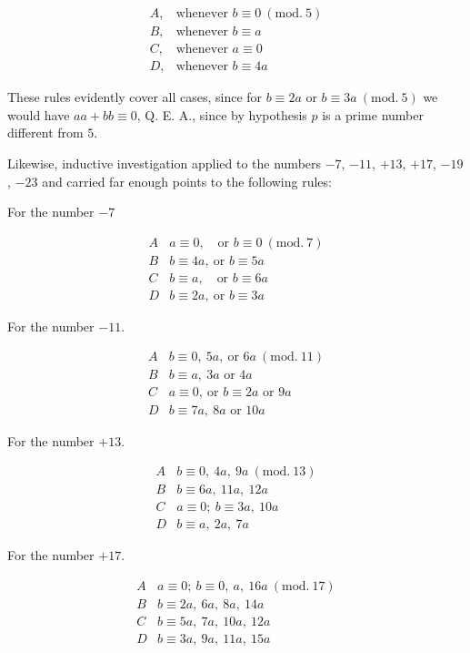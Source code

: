 %
\[
\begin{array}{ll}
A,&\text{whenever }b\equiv0\ (\mathrm{mod.}\ 5)\\
B,&\text{whenever }b\equiv a\\
C,&\text{whenever }a\equiv0\\
D,&\text{whenever }b\equiv4a
\end{array}
\]

These rules evidently cover all cases, since for $b\equiv2a$ or $b\equiv3a\ (\mathrm{mod.}\ 5)$ we would have $aa+bb\equiv0$, Q. E. A., since by hypothesis $p$ is a prime number different from $5$.

Likewise, inductive investigation applied to the numbers $-7$, $-11$, $+13$, $+17$, $-19$, $-23$ and carried far enough points to the following rules:
\begin{center}For the number $-7$\end{center}
\[
\begin{array}{c|l}
A&a\equiv0,\quad\text{or }b\equiv0\ (\mathrm{mod.}\ 7)\\
B&b\equiv4a,\ \text{or }b\equiv5a\\
C&b\equiv a,\quad\text{or }b\equiv6a\\
D&b\equiv2a,\ \text{or }b\equiv3a
\end{array}
\]

\begin{center}For the number $-11$.\end{center}
\[
\begin{array}{c|l}
A&b\equiv0,\ 5a,\ \text{or }6a\ (\mathrm{mod.}\ 11)\\
B&b\equiv a,\ 3a\text{ or }4a\\
C&a\equiv0,\ \text{or }b\equiv2a\text{ or }9a\\
D&b\equiv7a,\ 8a\text{ or }10a
\end{array}
\]

\begin{center}For the number $+13$.\end{center}
\[
\begin{array}{c|l}
A&b\equiv0,\ 4a,\ 9a\ (\mathrm{mod.}\ 13)\\
B&b\equiv6a,\ 11a,\ 12a\\
C&a\equiv0;\ b\equiv3a,\ 10a\\
D&b\equiv a,\ 2a,\ 7a
\end{array}
\]

\begin{center}For the number $+17$.\end{center}
\[
\begin{array}{c|l}
A&a\equiv0;\ b\equiv0,\ a,\ 16a\ (\mathrm{mod.}\ 17)\\
B&b\equiv2a,\ 6a,\ 8a,\ 14a\\
C&b\equiv5a,\ 7a,\ 10a,\ 12a\\
D&b\equiv3a,\ 9a,\ 11a,\ 15a
\end{array}
\]

